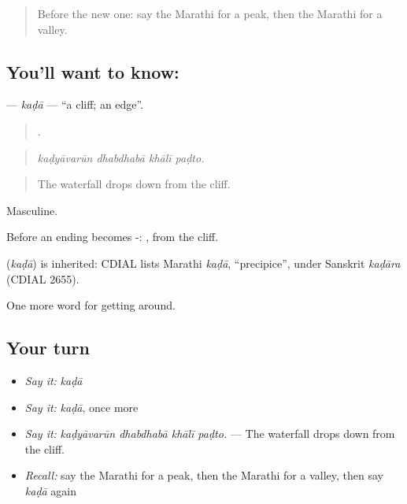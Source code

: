 \label{lesson:MR-C442-kada}



\begin{quote}
Before the new one: say the Marathi for a peak, then the Marathi for a valley.
\end{quote}

\subsection*{You'll want to know: }
\textbf{} — \emph{kaḍā} — \textquotedblleft{}a cliff; an edge\textquotedblright{}.

\begin{quote}
   .
\end{quote}

\begin{quote}
\emph{kaḍyāvarūn dhabdhabā khālī paḍto.}
\end{quote}

\begin{quote}
The waterfall drops down from the cliff.
\end{quote}

Masculine.

Before an ending  becomes -: , from the cliff.

\begin{cousinweb}
\textbf{} (\emph{kaḍā}) is inherited: CDIAL lists Marathi \emph{kaḍā}, \textquotedblleft{}precipice\textquotedblright{}, under Sanskrit \emph{kaḍāra} (CDIAL 2655).
\end{cousinweb}

\begin{grammarlens}[title={What you've built}]
One more word for getting around.
\end{grammarlens}

\subsection*{Your turn}
\begin{itemize}
\raggedright
  \item \emph{Say it:} \emph{kaḍā}
  \item \emph{Say it:} \emph{kaḍā}, once more
  \item \emph{Say it:} \emph{kaḍyāvarūn dhabdhabā khālī paḍto.} — The waterfall drops down from the cliff.
  \item \emph{Recall:} say the Marathi for a peak, then the Marathi for a valley, then say \emph{kaḍā} again
\end{itemize}

